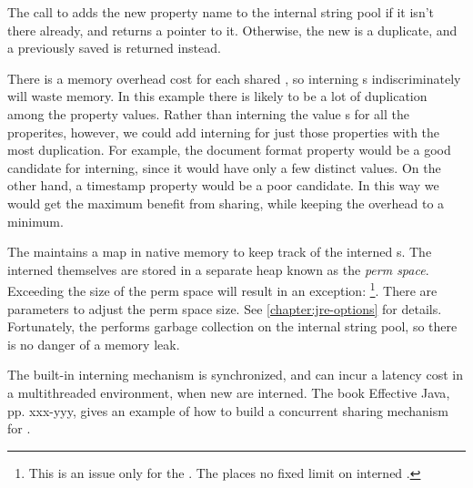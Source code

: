 The call to  adds the new property name 
to the internal string
pool if it isn't there already, and returns a pointer to it. Otherwise, the
new  is a duplicate, and a previously saved  is
returned instead. 

There is a memory overhead cost for each shared
, so interning s indiscriminately will waste memory.
In this example there is likely to be a lot of duplication
among the property values. Rather than interning the value s for
all the properites, however, we could add interning for just those
properties with the most duplication. For example, the document format
property would be a good candidate for interning, since it would have only
a few distinct values.
On the other hand, a timestamp property would be a poor candidate. In this way
we would get the maximum benefit from sharing, while keeping the overhead to a
minimum. 

The \jre maintains a map in native memory to keep track of the interned
s.
The interned  themselves are stored in a separate heap known as
the \emph{perm space}. 
Exceeding the size of the perm space will result in an exception:
\footnote{This is an issue only for the \oracle \jre. The \ibm \jre places no 
fixed limit on interned .}.
There are parameters to adjust the perm space size. See \autoref{chapter:jre-options} for details. 
Fortunately, the \jre performs garbage collection on the
internal string pool, so there is no danger of a memory leak.

The built-in interning mechanism is synchronized, and can incur a latency cost
in a multithreaded environment, when new  are interned.
The book Effective Java\cite{EffectiveJavaBook}, pp. xxx-yyy, gives an example
of how to build a concurrent sharing mechanism for .

